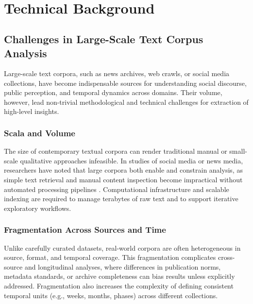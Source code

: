 

\chapter{Technical Background}
\label{ChapterTechnicalBackground}


\section{Challenges in Large-Scale Text Corpus Analysis}

Large-scale text corpora, such as news archives, web crawls, or social media collections, have become indispensable sources for understanding social discourse, public perception, and temporal dynamics across domains. Their volume, however, lead non-trivial methodological and technical challenges for extraction of high-level insights.

\subsection{Scala and Volume}

The size of contemporary textual corpora can render traditional manual or small-scale qualitative approaches infeasible. In studies of social media or news media, researchers have noted that large corpora both enable and constrain analysis, as simple text retrieval and manual content inspection become impractical without automated processing pipelines \cite{moreno2023strategies}. Computational infrastructure and scalable indexing are required to manage terabytes of raw text and to support iterative exploratory workflows.

\subsection{Fragmentation Across Sources and Time}

Unlike carefully curated datasets, real-world corpora are often heterogeneous in source, format, and temporal coverage. This fragmentation complicates cross-source and longitudinal analyses, where differences in publication norms, metadata standards, or archive completeness can bias results unless explicitly addressed. Fragmentation also increases the complexity of defining consistent temporal units (e.g., weeks, months, phases) across different collections.

